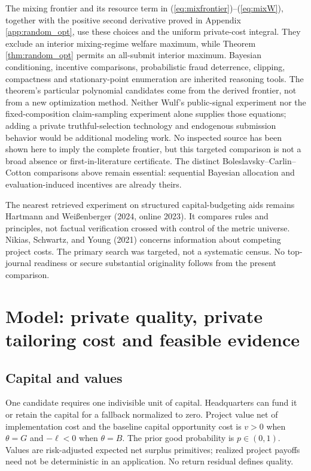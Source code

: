 \documentclass[11pt]{article}
\begin{document}
The mixing frontier and its resource term in (\ref{eq:mixfrontier})--(\ref{eq:mixW}), together with the positive second derivative proved in Appendix \ref{app:random_opt}, use these choices and the uniform private-cost integral. They exclude an interior mixing-regime welfare maximum, while Theorem \ref{thm:random_opt} permits an all-submit interior maximum. Bayesian conditioning, incentive comparisons, probabilistic fraud deterrence, clipping, compactness and stationary-point enumeration are inherited reasoning tools. The theorem's particular polynomial candidates come from the derived frontier, not from a new optimization method. Neither Wulf's public-signal experiment nor the fixed-composition claim-sampling experiment alone supplies those equations; adding a private truthful-selection technology and endogenous submission behavior would be additional modeling work. No inspected source has been shown here to imply the complete frontier, but this targeted comparison is not a broad absence or first-in-literature certificate. The distinct Boleslavsky--Carlin--Cotton comparisons above remain essential: sequential Bayesian allocation and evaluation-induced incentives are already theirs.

The nearest retrieved experiment on structured capital-budgeting aids remains Hartmann and Wei\ss enberger (2024, online 2023). It compares rules and principles, not factual verification crossed with control of the metric universe. Nikias, Schwartz, and Young (2021) concerns information about competing project costs. The primary search was targeted, not a systematic census. No top-journal readiness or secure substantial originality follows from the present comparison.

\section{Model: private quality, private tailoring cost and feasible evidence}\label{sec:model}
\subsection{Capital and values}
One candidate requires one indivisible unit of capital. Headquarters can fund it or retain the capital for a fallback normalized to zero. Project value net of implementation cost and the baseline capital opportunity cost is $v>0$ when $\theta=G$ and $-\ell<0$ when $\theta=B$. The prior good probability is $p\in(0,1)$. Values are risk-adjusted expected net surplus primitives; realized project payoffs need not be deterministic in an application. No return residual defines quality.
\end{document}
